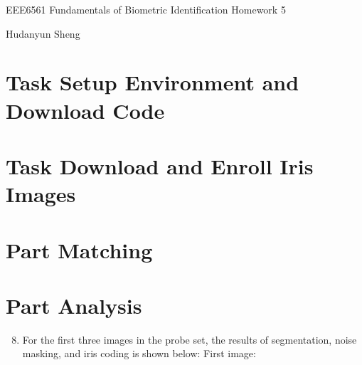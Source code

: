 \documentclass[a4paper]{article}
\begin{document}
\begin{spacing}{2.0}
\begin{flushleft}\begin{huge}EEE6561  Fundamentals of Biometric Identification   Homework 5\end{huge}
\end{flushleft}
\begin{flushright}\begin{Large}Hudanyun Sheng\end{Large}\end{flushright}

\section*{\huge\textbf{ Task \uppercase\expandafter{} Setup Environment and Download Code}  }
	\normalsize

	
\section*{\huge\textbf{ Task \uppercase\expandafter{} Download and Enroll Iris Images}  }
	\normalsize

\section*{\huge\textbf{ Part \uppercase\expandafter{} Matching}  }
	\normalsize

\section*{\huge\textbf{ Part \uppercase\expandafter{} Analysis}  }
	\normalsize
	
	\begin{enumerate}
	\setcounter{enumi}{7}
	\item For the first three images in the probe set, the results of segmentation, noise masking, and iris coding is shown below:
	First image:\\
	

\end{enumerate}
\end{spacing}
\end{document}
